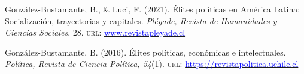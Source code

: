 





\begin{publications}

\begin{benumerate}{2}

\item{\small Gonz\'alez-Bustamante, B., \& Luci, F. (2021). Élites políticas en América Latina: Socialización, trayectorias y capitales. {\itshape Pléyade, Revista de Humanidades y Ciencias Sociales}, 28. {\scshape url}: \href{http://www.revistapleyade.cl/index.php/OJS/issue/view/30}{\textcolor{blue}{www.revistapleyade.cl}}}\vspace{1mm}

\item{\small Gonz\'alez-Bustamante, B. (2016). Élites políticas, económicas e intelectuales. {\itshape Pol\'itica, Revista de Ciencia Pol\'itica, 54}(1). {\scshape url}: \href{https://revistapolitica.uchile.cl/index.php/RP/issue/view/4365}{\textcolor{blue}{https://revistapolitica.uchile.cl}}}\vspace{1mm}

\end{benumerate}

\end{publications}
\pagebreak